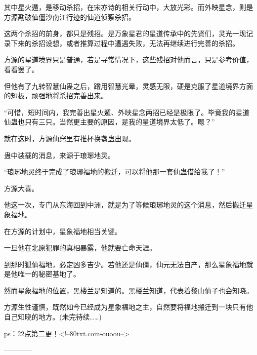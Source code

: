 \begin{this_body}
其中星火遁，是移动杀招，在宋亦诗的相关行动中，大放光彩。而外映星念，则是方源勘破仙僵沙南江行迹的仙道侦察杀招。

这两个杀招的前身，都只是残招。是万象星君的星道传承中的先贤们，灵光一现记录下来的杀招设想，或者推算过程中遭遇失败，无法再继续进行完善的杀招。

方源的星道境界只是普通，若是寻常情况下，这些残招对他而言，只是参考价值，看看罢了。

但他有了九转智慧仙蛊之后，蹭用智慧光晕，灵感无限，硬是克服了星道境界方面的短板，顽强地将杀招完善出来。

“可惜，短时间内，我完善出星火遁、外映星念两招已经是极限了。毕竟我的星道仙蛊也只有三只。当然更主要的原因，是我的星道境界太低了。嗯？”

就在这时，方源仙窍里有推杯换盏蛊出现。

蛊中装载的消息，来源于琅琊地灵。

“琅琊地灵终于完成了琅琊福地的搬迁，可以将他那一套仙蛊借给我了！”

方源大喜。

他这一次，专门从东海回到中洲，就是为了等候琅琊地灵的这个消息，然后搬迁星象福地。

在方源的计划中，星象福地相当关键。

一旦他在北原犯罪的真相暴露，他就要亡命天涯。

到那时狐仙福地，必定凶多吉少。若他还是仙僵，仙元无法自产，那么星象福地就是他唯一的秘密基地了。

然而星象福地的位置，黑楼兰是知道的。黑楼兰知道，代表着黎山仙子也会知晓。

方源生性谨慎，既然如今已经成为星象福地之主，自然要将福地搬迁到一块只有他自己知晓的地方。(未完待续……)

ps：22点第二更！<!--80txt.com-ouoou-->

------------

\end{this_body}


